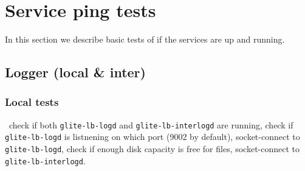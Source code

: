 





\section{Service ping tests}
\label{s:ping}

In this section we describe basic tests of \LB if the services are up and running.

\subsection{Logger (local \& inter)}

\subsubsection{Local tests}
\what\ check if both \texttt{glite-lb-logd} and \texttt{glite-lb-interlogd} are running,
check if \texttt{glite-lb-logd} is listnening on which port (9002 by default),
socket-connect to \texttt{glite-lb-logd},
check if enough disk capacity is free for  files,
socket-connect to \texttt{glite-lb-interlogd}.

\how\ 


